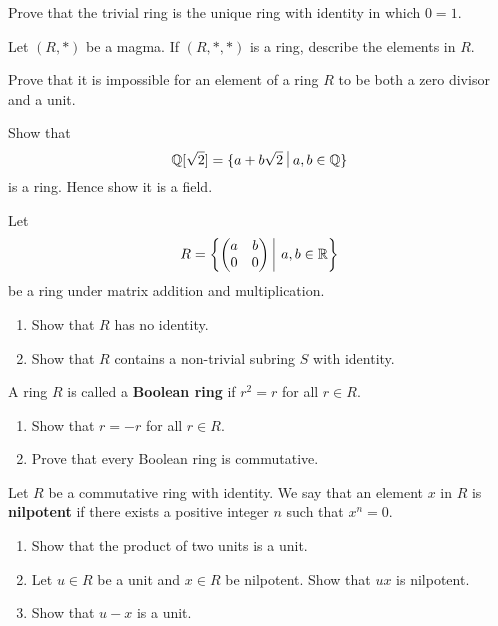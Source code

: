\begin{problem}
    Prove that the trivial ring is the unique ring with identity in which $0 = 1$.
\end{problem}

\begin{problem}
    Let $(R, \ast)$ be a magma. If $(R, \ast, \ast)$ is a ring, describe the elements in $R$.
\end{problem}

\begin{problem}
    Prove that it is impossible for an element of a ring $R$ to be both a zero divisor and a unit.
\end{problem}

\begin{problem}
    Show that
    \[
        \Q[\sqrt2] = \{a + b\sqrt2 \vert a,b \in \Q\}
    \]
    is a ring. Hence show it is a field.
\end{problem}

\begin{problem}
    Let
    \[
        R = \left\{\begin{pmatrix}a&b\\0&0\end{pmatrix} \vert a,b \in \R\right\}    
    \]
    be a ring under matrix addition and multiplication.
    \begin{enumerate}[label=(\roman*)]
        \item Show that $R$ has no identity.
        \item Show that $R$ contains a non-trivial subring $S$ with identity.
    \end{enumerate}
\end{problem}

\begin{problem}
    A ring $R$ is called a \textbf{Boolean ring} if $r^2 = r$ for all $r \in R$.
    \begin{enumerate}[label=(\roman*)]
        \item Show that $r = -r$ for all $r \in R$.
        \item Prove that every Boolean ring is commutative.
    \end{enumerate}
\end{problem}

\begin{problem}
    Let $R$ be a commutative ring with identity. We say that an element $x$ in $R$ is \textbf{nilpotent} if there exists a positive integer $n$ such that $x^n = 0$.
    \begin{enumerate}[label=(\roman*)]
        \item Show that the product of two units is a unit.
        \item Let $u \in R$ be a unit and $x \in R$ be nilpotent. Show that $ux$ is nilpotent.
        \item Show that $u - x$ is a unit.
    \end{enumerate}
\end{problem}

